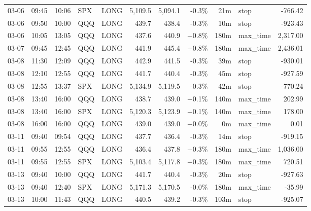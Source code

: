 \documentclass[11pt,a4paper,twoside]{article}
\begin{document}
\begin{center}
\begin{longtable}{>{\color{txtmain}}l l l l l r r r r >{\color{txtmain}}l r}
03-06 & 09:45 & 10:06 & SPX & LONG & 5,109.5 & 5,094.1 & \textcolor{lossred}{-0.3\%} & 21m & stop & \textcolor{lossred}{-766.42} \\
03-06 & 09:50 & 10:00 & QQQ & LONG & 439.7 & 438.4 & \textcolor{lossred}{-0.3\%} & 10m & stop & \textcolor{lossred}{-923.43} \\
03-06 & 10:05 & 13:05 & QQQ & LONG & 437.6 & 440.9 & \textcolor{wingreen}{+0.8\%} & 180m & max\_time & \textcolor{wingreen}{2,317.00} \\
03-07 & 09:45 & 12:45 & QQQ & LONG & 441.9 & 445.4 & \textcolor{wingreen}{+0.8\%} & 180m & max\_time & \textcolor{wingreen}{2,436.01} \\
03-08 & 11:30 & 12:09 & QQQ & LONG & 442.9 & 441.5 & \textcolor{lossred}{-0.3\%} & 39m & stop & \textcolor{lossred}{-930.01} \\
03-08 & 12:10 & 12:55 & QQQ & LONG & 441.7 & 440.4 & \textcolor{lossred}{-0.3\%} & 45m & stop & \textcolor{lossred}{-927.59} \\
03-08 & 12:55 & 13:37 & SPX & LONG & 5,134.9 & 5,119.5 & \textcolor{lossred}{-0.3\%} & 42m & stop & \textcolor{lossred}{-770.24} \\
03-08 & 13:40 & 16:00 & QQQ & LONG & 438.7 & 439.0 & \textcolor{wingreen}{+0.1\%} & 140m & max\_time & \textcolor{wingreen}{202.99} \\
03-08 & 13:40 & 16:00 & SPX & LONG & 5,120.3 & 5,123.9 & \textcolor{wingreen}{+0.1\%} & 140m & max\_time & \textcolor{wingreen}{178.00} \\
03-08 & 16:00 & 16:00 & QQQ & LONG & 439.0 & 439.0 & \textcolor{wingreen}{+0.0\%} & 0m & max\_time & \textcolor{wingreen}{0.01} \\
03-11 & 09:40 & 09:54 & QQQ & LONG & 437.7 & 436.4 & \textcolor{lossred}{-0.3\%} & 14m & stop & \textcolor{lossred}{-919.15} \\
03-11 & 09:55 & 12:55 & QQQ & LONG & 436.4 & 437.8 & \textcolor{wingreen}{+0.3\%} & 180m & max\_time & \textcolor{wingreen}{1,036.00} \\
03-11 & 09:55 & 12:55 & SPX & LONG & 5,103.4 & 5,117.8 & \textcolor{wingreen}{+0.3\%} & 180m & max\_time & \textcolor{wingreen}{720.51} \\
03-13 & 09:40 & 10:00 & QQQ & LONG & 441.7 & 440.4 & \textcolor{lossred}{-0.3\%} & 20m & stop & \textcolor{lossred}{-927.63} \\
03-13 & 09:40 & 12:40 & SPX & LONG & 5,171.3 & 5,170.5 & \textcolor{lossred}{-0.0\%} & 180m & max\_time & \textcolor{lossred}{-35.99} \\
03-13 & 10:00 & 11:43 & QQQ & LONG & 440.5 & 439.2 & \textcolor{lossred}{-0.3\%} & 103m & stop & \textcolor{lossred}{-925.07} \\

\end{longtable}
\end{center}
\end{document}

